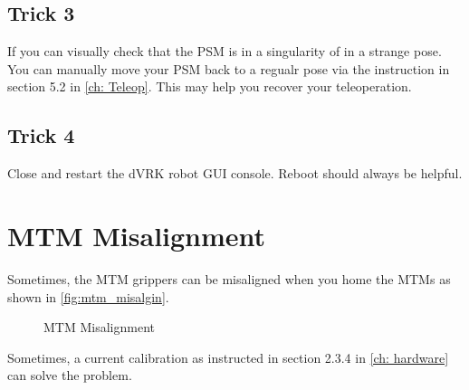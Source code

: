 \subsection{Trick 3}

If you can visually check that the PSM is in a singularity of in a strange pose. You can manually move your PSM back to a regualr pose via the instruction in section 5.2 in \autoref{ch: Teleop}. This may help you recover your teleoperation.

\subsection{Trick 4}

Close and restart the dVRK robot GUI console. Reboot should always be helpful.

\section{MTM Misalignment}

Sometimes, the MTM grippers can be misaligned when you home the MTMs as shown in \autoref{fig:mtm_misalgin}.

\begin{figure}[H]
\centering
{}
\hfil
{}
\caption{MTM Misalignment}
\label{fig:mtm_misalgin}
\end{figure}

Sometimes, a current calibration as instructed in section 2.3.4 in \autoref{ch: hardware} can solve the problem. 

